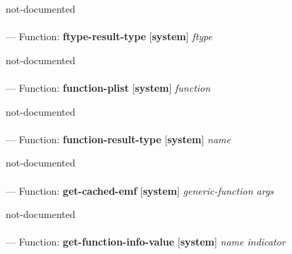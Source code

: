 \begin{adjustwidth}{5em}{5em}
not-documented
\end{adjustwidth}

\paragraph{}
\label{SYSTEM:FTYPE-RESULT-TYPE}
--- Function: \textbf{ftype-result-type} [\textbf{system}] \textit{ftype}

\begin{adjustwidth}{5em}{5em}
not-documented
\end{adjustwidth}

\paragraph{}
\label{SYSTEM:FUNCTION-PLIST}
--- Function: \textbf{function-plist} [\textbf{system}] \textit{function}

\begin{adjustwidth}{5em}{5em}
not-documented
\end{adjustwidth}

\paragraph{}
\label{SYSTEM:FUNCTION-RESULT-TYPE}
--- Function: \textbf{function-result-type} [\textbf{system}] \textit{name}

\begin{adjustwidth}{5em}{5em}
not-documented
\end{adjustwidth}

\paragraph{}
\label{SYSTEM:GET-CACHED-EMF}
--- Function: \textbf{get-cached-emf} [\textbf{system}] \textit{generic-function args}

\begin{adjustwidth}{5em}{5em}
not-documented
\end{adjustwidth}

\paragraph{}
\label{SYSTEM:GET-FUNCTION-INFO-VALUE}
--- Function: \textbf{get-function-info-value} [\textbf{system}] \textit{name indicator}

